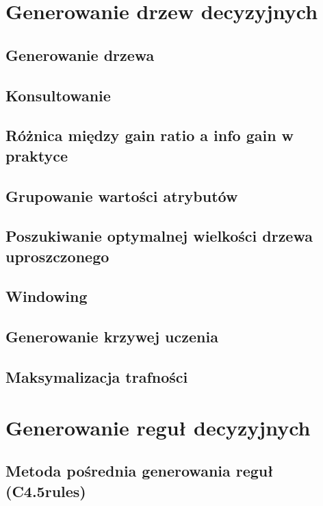\documentclass{article}
\begin{document}


\section{Generowanie drzew decyzyjnych}

\subsection{Generowanie drzewa}

\subsection{Konsultowanie}

\subsection{Różnica między gain ratio a info gain w praktyce}

\subsection{Grupowanie wartości atrybutów}

\subsection{Poszukiwanie optymalnej wielkości drzewa uproszczonego}

\subsection{Windowing}

\subsection{Generowanie krzywej uczenia}

\subsection{Maksymalizacja trafności}

\section{Generowanie reguł decyzyjnych}

\subsection{Metoda pośrednia generowania reguł (C4.5rules)}
\end{document}
